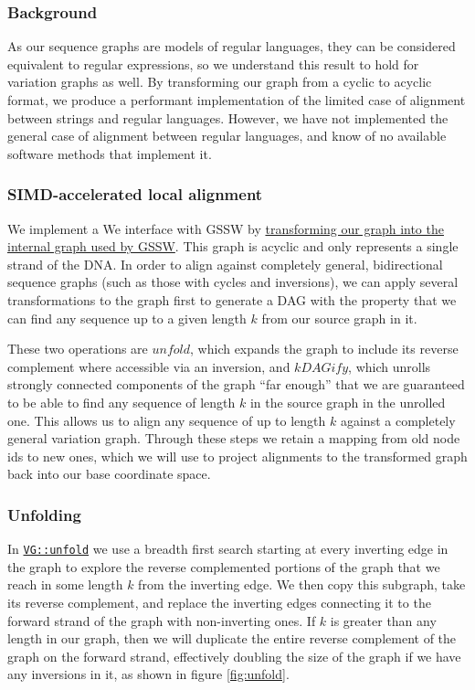 \documentclass[12pt]{article}
\begin{document}
\subsubsection{Background}


As our sequence graphs are models of regular languages, they can be considered equivalent to regular expressions, so we understand this result to hold for variation graphs as well.
By transforming our graph from a cyclic to acyclic format, we produce a performant implementation of the limited case of alignment between strings and regular languages. However, we have not implemented the general case of alignment between regular languages, and know of no available software methods that implement it.

\subsubsection{SIMD-accelerated local alignment}

We implement a 
We interface with GSSW by \href{https://github.com/vgteam/vg/blob/fbcb6e62/src/vg.cpp#L6461-L6532}{transforming our graph into the internal graph used by GSSW}.
This graph is acyclic and only represents a single strand of the DNA.
In order to align against completely general, bidirectional sequence graphs (such as those with cycles and inversions), we can apply several transformations to the graph first to generate a DAG with the property that we can find any sequence up to a given length $k$ from our source graph in it.

These two operations are $unfold$, which expands the graph to include its reverse complement where accessible via an inversion, and $kDAGify$, which unrolls strongly connected components of the graph ``far enough'' that we are guaranteed to be able to find any sequence of length $k$ in the source graph in the unrolled one.
This allows us to align any sequence of up to length $k$ against a completely general variation graph.
Through these steps we retain a mapping from old node ids to new ones, which we will use to project alignments to the transformed graph back into our base coordinate space.

\subsubsection{Unfolding}

In \href{https://github.com/vgteam/vg/blob/fbcb6e62/src/vg.cpp#L8289-L8400}{{\tt VG::unfold}} we use a breadth first search starting at every inverting edge in the graph to explore the reverse complemented portions of the graph that we reach in some length $k$ from the inverting edge.
We then copy this subgraph, take its reverse complement, and replace the inverting edges connecting it to the forward strand of the graph with non-inverting ones.
If $k$ is greater than any length in our graph, then we will duplicate the entire reverse complement of the graph on the forward strand, effectively doubling the size of the graph if we have any inversions in it, as shown in figure \ref{fig:unfold}.
\end{document}
